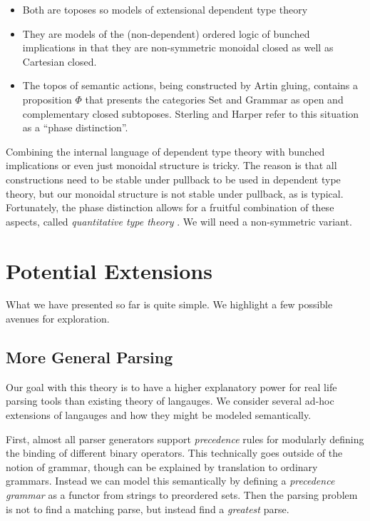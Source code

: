 \documentclass[12pt]{article}
\newcommand{\Set}{\textrm{Set}}
\newcommand{\Grammar}{\textrm{Grammar}}
\begin{document}
\begin{itemize}
\item Both are toposes so models of extensional dependent type theory
\item They are models of the (non-dependent) ordered logic of bunched
  implications in that they are non-symmetric monoidal closed as well
  as Cartesian closed.
\item The topos of semantic actions, being constructed by Artin
  gluing, contains a proposition $\Phi$ that presents the categories
  $\Set$ and $\Grammar$ as open and complementary closed
  subtoposes. Sterling and Harper refer to this situation as a ``phase
  distinction''.
\end{itemize}

Combining the internal language of dependent type theory with bunched
implications or even just monoidal structure is tricky. The reason is
that all constructions need to be stable under pullback to be used in
dependent type theory, but our monoidal structure is not stable under
pullback, as is typical.
%
Fortunately, the phase distinction allows for a fruitful combination
of these aspects, called \emph{quantitative type theory}
\cite{atkey-qtt,mcbride-nuttin}.
%
We will need a non-symmetric variant.

\section{Potential Extensions}

What we have presented so far is quite simple. We highlight a few
possible avenues for exploration.

\subsection{More General Parsing}

Our goal with this theory is to have a higher explanatory power for
real life parsing tools than existing theory of langauges. We consider
several ad-hoc extensions of langauges and how they might be modeled
semantically.

First, almost all parser generators support \emph{precedence} rules
for modularly defining the binding of different binary operators.
This technically goes outside of the notion of grammar, though can be
explained by translation to ordinary grammars.
%
Instead we can model this semantically by defining a \emph{precedence
grammar} as a functor from strings to preordered sets. Then the
parsing problem is not to find a matching parse, but instead find a
\emph{greatest} parse.
\end{document}
